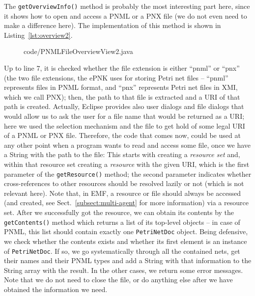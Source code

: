 The {\tt getOverviewInfo()} method is probably the most interesting
part here, since it shows how to open and access a PNML or a
PNX file (we do not even need to make a difference here). The implementation
of this method is shown in Listing~\ref{lst:overview2}.
%
\begin{figure}[htbp!]
%
  {code/PNMLFileOverviewView2.java}
\end{figure}
% 
Up to line 7, it is checked whether the file extension is
either ``pnml'' or ``pnx'' (the two file extensions, the ePNK uses
for storing Petri net files -- ``pnml'' represents files in PNML format, and
``pnx'' represents Petri net files in XMI, which we call PNX); then, the
path to that file is extracted and a URI of that path is created.
Actually, Eclipse provides also user dialogs and file dialogs that would
allow us to ask the user for a file name that would be returned as a URI; here
we used the selection mechanism and the file to get hold of some legal URI
of a PNML or PNX file. Therefore, the code that comes now, could be used at any
other point when a program wants to read and access some file, once we have a
String with the path to the file: This starts with creating a \emph{resource
set}%
and, within that resource set creating a \emph{resource}%
with the given URI, which is the first parameter of the {\tt getResource()}%
method; the second parameter indicates whether cross-references to other resources should be
resolved lazily or not (which is not relevant here). Note that, in EMF, a
resource or file should always be accessed (and created, see
Sect.~\ref{subsect:multi-agent} for more information) via a
resource set. After we successfully got the resource, we can obtain its contents
by the {\tt getContents()}%
method which returns a list of its top-level objects
-- in case of PNML, this list should contain exactly one {\tt PetriNetDoc} object. 
Being defensive, we check whether the contents exists and whether its first element is an instance
of {\tt PetriNetDoc}. If so, we go systematically through all the contained nets, get
their names and their PNML types and add a String with that information to the
String array with the result. In the other cases, we return some error
messages. Note that we do not need to close the file, or do anything else after
we have obtained the information we need.

